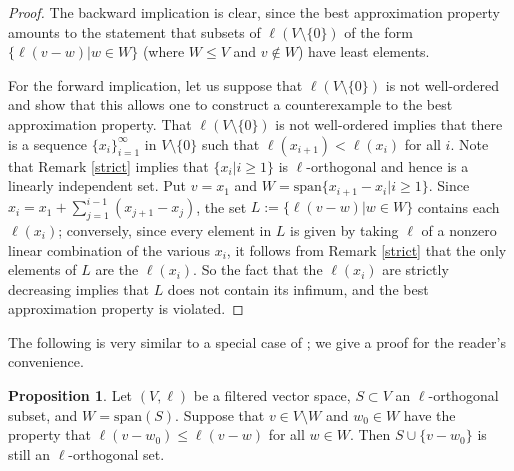 \documentclass[11pt]{amsart}
\theoremstyle{definition}
\newtheorem{prop}[theorem]{Proposition}
\theoremstyle{remark}
\numberwithin{equation}{section}
\begin{document}
\begin{proof}
	The backward implication is clear, since the best approximation property amounts to the statement that subsets of $\ell(V\setminus\{0\})$ of the form $\{\ell(v-w)|w\in W\}$ (where $W\leq V$ and $v\notin W$) have least elements.
	
	For the forward implication, let us suppose that $\ell(V\setminus\{0\})$ is not well-ordered and show that this allows one to construct a counterexample to the best approximation property.  That $\ell(V\setminus\{0\})$ is not well-ordered implies that there is a sequence $\{x_i\}_{i=1}^{\infty}$ in $V\setminus\{0\}$ such that $\ell(x_{i+1})<\ell(x_i)$ for all $i$.  Note that Remark \ref{strict}  implies that $\{x_i|i\geq 1\}$ is $\ell$-orthogonal and hence is a linearly independent set.  Put $v=x_1$ and $W=\mathrm{span}\{x_{i+1}-x_i|i\geq 1\}$.  Since $x_i=x_1+\sum_{j=1}^{i-1}(x_{j+1}-x_j)$, the set $L:=\{\ell(v-w)|w\in W\}$ contains each $\ell(x_i)$; conversely, since every element in $L$ is given by taking $\ell$ of a nonzero linear combination of the various $x_i$, it follows from Remark \ref{strict} that the only elements of $L$ are the $\ell(x_i)$.  So the fact that the $\ell(x_i)$ are strictly decreasing implies that $L$ does not contain its infimum, and the best approximation property is violated. 
\end{proof}





The following is very similar to a special case of \cite[Lemma 2.15]{UZ}; we give a proof for the reader's convenience.
\begin{prop}\label{project}
	Let $(V,\ell)$ be a filtered vector space, $S\subset V$ an $\ell$-orthogonal subset, and $W=\mathrm{span}(S)$.  Suppose that  $v\in V\setminus W$ and $w_0\in W$ have the property that $\ell(v-w_0)\leq \ell(v-w)$ for all $w\in W$.  Then $S\cup\{v-w_0\}$ is still an $\ell$-orthogonal set.
\end{prop}
\end{document}
